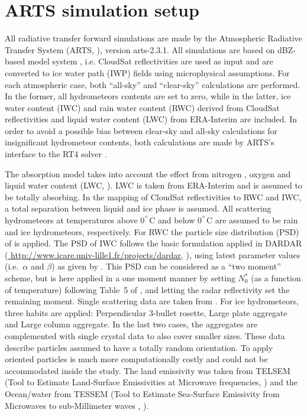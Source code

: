 \documentclass[amt, manuscript]{copernicus}
\begin{document}
\section{ARTS simulation setup}    %
\label{appendix:ARTS_setup}
%
All radiative transfer forward simulations are made by the Atmospheric Radiative
Transfer System (ARTS, \citet{eriksson:arts2:11,buehler:artst:18}), version
arts-2.3.1. All simulations are based on dBZ-based model system \citep{ekelund2020using}, i.e. CloudSat reflectivities are used as input and are converted to ice water path (IWP) fields using microphysical assumptions. For each atmospheric case, both ``all-sky'' and ``clear-sky'' calculations are performed. In the former, all hydrometeors contents are set to zero, while in the latter, ice water content (IWC) and rain water content (RWC) derived from CloudSat reflectivities and liquid water content (LWC) from ERA-Interim \citep{dee2011erainterim} are included. In order to avoid a possible bias between clear-sky and all-sky calculations for insignificant hydrometeor contents, both calculations are made by ARTS's interface to the RT4 solver \citep{evans1995microwavec}.

The absorption model takes into account the effect from nitrogen
\citep{pwr:93}, oxygen \citep{pwr:93} and liquid water content (LWC, \citet{ellison2007permittivity}). LWC is taken from ERA-Interim  and is assumed to be totally absorbing. In the mapping of CloudSat reflectivities to RWC and IWC, a total separation between liquid and ice phase is assumed. All scattering hydrometeors at temperatures above 0$^{^{\circ}}$C and below 0$^{^{\circ}}$C are assumed to be rain and ice hydrometeors, respectively. For RWC the particle size
distribution (PSD) of \citet{abel2012improved} is applied. The PSD of IWC follows the basic formulation applied in DARDAR (\url{
http://www.icare.univ-lille1.fr/projects/dardar}, \citet{delanoe2008variational}), using latest parameter
values (i.e.\ $\alpha$ and $\beta$) as given by \citet{cazenave2019evolution}.
This PSD can be considered as a ``two moment'' scheme, but is here applied in
a one moment manner by setting $N_0^*$ (as a function of temperature)
following Table~5 of \citet{delanoe2014normalized}, and letting the radar
reflectivity set the remaining moment. Single scattering data are taken from
\citet{eriksson:agene:18}. For ice hydrometeors, three habits are applied:
Perpendicular 3-bullet rosette, Large plate aggregate and Large column
aggregate. In the last two cases, the aggregates are complemented with single
crystal data to also cover smaller sizes. These data describe particles
assumed to have a totally random orientation. To apply oriented particles is
much more computationally costly and could not be accommodated inside the
study. The land emissivity was taken from TELSEM (Tool to Estimate Land‐Surface Emissivities at Microwave frequencies, \citet{aires2011tool}) and the
Ocean/water from TESSEM (Tool to Estimate Sea‐Surface Emissivity from Microwaves to sub‐Millimeter waves , \citet{prigent2017sea}).
\end{document}
